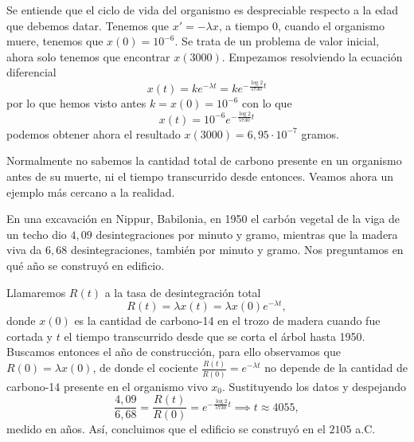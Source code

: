 \documentclass[../main.tex]{subfiles}
\begin{document}
\begin{solution}
	Se entiende que el ciclo de vida del organismo
	es despreciable respecto a la edad que debemos datar. Tenemos que
	\(x' = -\lambda x\), a tiempo \(0\), cuando el organismo muere, tenemos que
	\(x(0) = 10^{-6}\). Se trata de un problema de valor inicial, ahora solo tenemos
	que encontrar \(x(3000)\). Empezamos resolviendo la ecuación diferencial
	\[x(t) = k e^{-\lambda t} = k e^{-\frac{\log 2}{5730} t}\]
	por lo que hemos visto antes \(k = x(0) = 10^{-6}\) con lo que
	\[x(t) = 10^{-6} e^{-\frac{\log 2}{5730} t}\]
	podemos obtener ahora el resultado \(x(3000) = 6,95 \cdot 10^{-7}\) gramos.
\end{solution}

Normalmente no sabemos la cantidad total de carbono presente en un organismo
antes de su muerte, ni el tiempo transcurrido desde entonces. Veamos ahora un
ejemplo más cercano a la realidad.

\begin{example}
	En una excavación en Nippur, Babilonia, en 1950 el carbón vegetal de la viga
	de un techo dio \(4,09\) desintegraciones por minuto y gramo, mientras que
	la madera viva da \(6,68\) desintegraciones, también por minuto y gramo.
	Nos preguntamos en qué año se construyó en edificio.
\end{example}

\begin{solution}
	Llamaremos \(R(t)\) a la tasa de desintegración total
	\[R(t) = \lambda x(t) = \lambda x(0) e^{-\lambda t},\]
	donde \(x(0)\) es la
	cantidad de carbono-14 en el trozo de madera cuando fue cortada y \(t\) el
	tiempo transcurrido desde que se corta el árbol hasta 1950. Buscamos entonces
	el año de construcción, para ello observamos que \(R(0) = \lambda x(0)\), de
    donde el cociente \(\frac{R(t)}{R(0)} = e^{-\lambda t}\) no depende de la
    cantidad de carbono-14 presente en el organismo vivo \(x_0\). Sustituyendo
    los datos y despejando
    \[\frac{4,09}{6,68} = \frac{R(t)}{R(0)} = e^{-\frac{\log 2}{5730} t}
      \implies t \approx 4055,\]
    medido en años. Así, concluimos que el edificio se construyó en el \(2105\)
    a.C.
\end{solution}
\end{document}
